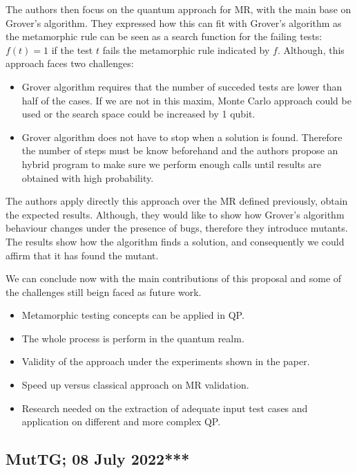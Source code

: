 \begin{itemize}
The authors then focus on the quantum approach for MR, with the main base on Grover's algorithm. They expressed how this can fit with Grover's algorithm as the metamorphic rule can be seen as a search function for the failing tests: $f(t)=1$ if the test $t$ fails the metamorphic rule indicated by $f$. Although, this approach faces two challenges:

\begin{itemize}
    \item Grover algorithm requires that the number of succeded tests are lower than half of the cases. If we are not in this maxim, Monte Carlo approach could be used or the search space could be increased by 1 qubit.
    \item Grover algorithm does not have to stop when a solution is found. Therefore the number of steps must be know beforehand and the authors propose an hybrid program to make sure we perform enough calls until results are obtained with high probability.
\end{itemize}

The authors apply directly this approach over the MR defined previously, obtain the expected results. Although, they would like to show how Grover's algorithm behaviour changes under the presence of bugs, therefore they introduce mutants. The results show how the algorithm finds a solution, and consequently we could affirm that it has found the mutant.

We can conclude now with the main contributions of this proposal and some of the challenges still beign faced as future work.

\begin{itemize}
    \item Metamorphic testing concepts can be applied in QP.
    \item The whole process is perform in the quantum realm.
    \item Validity of the approach under the experiments shown in the paper.
    \item Speed up versus classical approach on MR validation.
    \item Research needed on the extraction of adequate input test cases and application on different and more complex QP.
\end{itemize}

\vspace{15pt}
\subsection{MutTG; 08 July 2022***}


\end{itemize}
